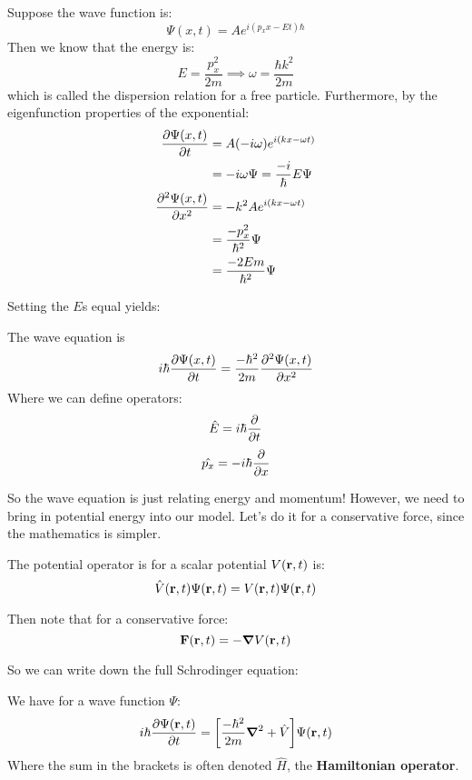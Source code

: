 Suppose the wave function is:
\[ \Psi(x, t) = Ae^{i(p_x x - Et) \hbar} \]
Then we know that the energy is:
\[ E = \frac{p_x^2}{2m} \implies \omega = \frac{\hbar k^2}{2m} \]
which is called the dispersion relation for a free particle.
Furthermore, by the eigenfunction properties of the exponential:
\begin{align*}
    \partialderivative{\Psi(x, t)}{t} &= A(-i \omega)e^{i(kx - \omega t)} \\
    &= -i \omega \Psi = \frac{-i}{\hbar} E \Psi \\
    \partialderivative{^2 \Psi(x, t)}{x^2} &= - k^2 A e^{i(k x - \omega t)} \\
    &= \frac{-p_x^2}{\hbar^2} \Psi \\
    &= \frac{-2Em}{\hbar^2} \Psi
\end{align*}

Setting the $E$s equal yields:
\begin{theorem}
    The wave equation is
    \[ i \hbar \partialderivative{\Psi(x, t)}{t} = \frac{-\hbar^2}{2m} \partialderivative{^2\Psi(x, t)}{x^2} \]
    Where we can define operators:
    \[ \hat{E} = i \hbar \partialderivative{}{t} \]
    \[ \hat{p_x} = -i\hbar \partialderivative{}{x} \]
\end{theorem}

So the wave equation is just relating energy and momentum! However, we need to bring in potential energy into our model.
Let's do it for a conservative force, since the mathematics is simpler.

\begin{definition}
    The potential operator is for a scalar potential $V(\mathbf{r}, t)$ is:
    \[ \hat{V}(\mathbf{r}, t) \Psi(\mathbf{r}, t) = V(\mathbf{r}, t) \Psi(\mathbf{r}, t) \]
\end{definition}

Then note that for a conservative force:
\[ \mathbf{F}(\mathbf{r}, t) = - \mathbf{\grad} V(\mathbf{r}, t) \]

So we can write down the full Schrodinger equation:
\begin{theorem} 
    We have for a wave function $\Psi$:
    \[ i \hbar \partialderivative{\Psi(\mbf{r}, t)}{t} = \qty[\frac{- \hbar^2}{2m} \grad^2 + \hat{V}] \Psi(\mbf{r}, t) \]
    Where the sum in the brackets is often denoted $\hat{H}$, the \textbf{Hamiltonian operator}.
\end{theorem}

